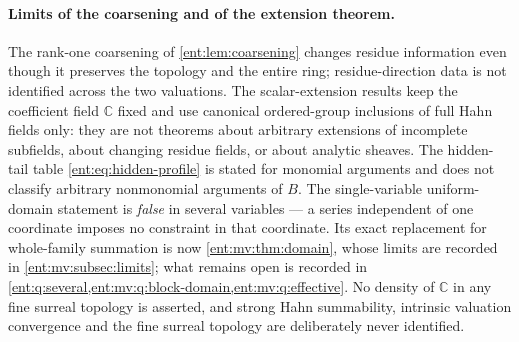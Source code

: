 \documentclass[11pt]{article}
\theoremstyle{plain}
\theoremstyle{plain}
\theoremstyle{plain}
\theoremstyle{definition}
\theoremstyle{definition}
\theoremstyle{definition}
\theoremstyle{definition}
\theoremstyle{remark}
\newcommand{\C}{\mathbb C}\newcommand{\R}{\mathbb R}
\begin{document}
\paragraph{Limits of the coarsening and of the extension theorem.}
The rank-one coarsening of \cref{ent:lem:coarsening} changes residue
information even though it preserves the topology and the entire ring;
residue-direction data is not identified across the two valuations. The
scalar-extension results keep the coefficient field $\C$ fixed and use
canonical ordered-group inclusions of full Hahn fields only: they are not
theorems about arbitrary extensions of incomplete subfields, about changing
residue fields, or about analytic sheaves. The hidden-tail table
\eqref{ent:eq:hidden-profile} is stated for monomial arguments and does not
classify arbitrary nonmonomial arguments of $B$. The single-variable
uniform-domain statement is \emph{false} in several variables --- a series
independent of one coordinate imposes no constraint in that coordinate. Its
exact replacement for whole-family summation is now
\cref{ent:mv:thm:domain}, whose limits are recorded in
\cref{ent:mv:subsec:limits}; what remains open is recorded in
\cref{ent:q:several,ent:mv:q:block-domain,ent:mv:q:effective}.
No density of $\C$ in any fine surreal topology is asserted, and strong Hahn
summability, intrinsic valuation convergence and the fine surreal topology
are deliberately never identified.
\end{document}
